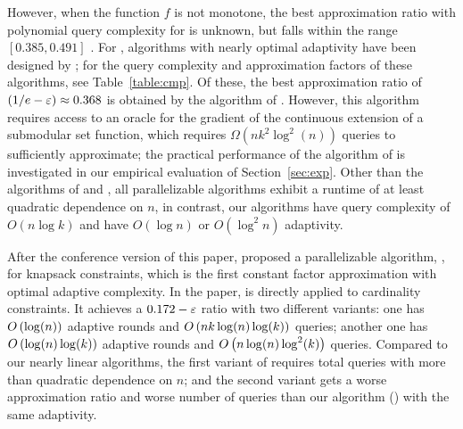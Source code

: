 However, when the function $f$ is not monotone, the
best approximation ratio with polynomial query complexity
for \sm is unknown, but falls within the range $[0.385, 0.491]$
\cite{Buchbinder2016,Gharan2011a}. For \sm,
algorithms with nearly optimal adaptivity have been
designed by ;
for the query complexity and approximation factors of
these algorithms, see Table~\ref{table:cmp}.
Of these, the best approximation ratio of $(1/e - \varepsilon) \approx 0.368$ 
is obtained by the algorithm of
.
However, this algorithm requires access to an oracle for
the gradient of the continuous extension of a submodular
set function, which requires $\Omega (nk^2 \log^2 (n) )$ 
queries to sufficiently approximate; the practical performance
of the algorithm of  is 
investigated in our empirical evaluation of
Section~\ref{sec:exp}.
Other than the algorithms of  and , 
all parallelizable
algorithms exhibit a runtime of at least quadratic dependence on $n$,
in contrast, our algorithms have query complexity of 
$O( n \log k )$ and have $O( \log n )$ or $O( \log^2 n )$
adaptivity.  

After the conference version \cite{kuhnle2021nearly} of this paper,
 proposed a parallelizable algorithm,
\park, for knapsack constraints,
which is the first constant factor approximation with optimal
adaptive complexity.
In the paper, \park is directly applied to cardinality constraints.
It achieves a $0.172-\varepsilon$ ratio with two different variants:
one has $O\left( \log(n) \right)$ adaptive rounds and $O\left( nk\log(n)\log(k) \right)$ queries;
another one has $O\left( \log(n)\log(k) \right)$ adaptive rounds and $O\left( n\log(n)\log^2(k) \right)$ queries.
Compared to our nearly linear algorithms, 
the first variant of \park requires total queries with more than quadratic dependence on $n$; 
and the second variant gets a worse approximation ratio and worse number of queries than our algorithm (\latg) with the same adaptivity.

